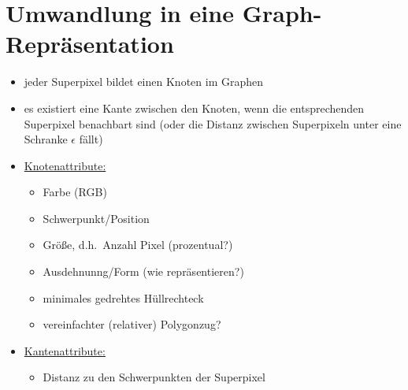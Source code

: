 \section{Umwandlung in eine Graph-Repräsentation}

\begin{itemize}
  \item jeder Superpixel bildet einen Knoten im Graphen
  \item es existiert eine Kante zwischen den Knoten, wenn die entsprechenden Superpixel benachbart sind (oder die Distanz zwischen Superpixeln unter eine Schranke $\epsilon$ fällt)
  \item \underline{Knotenattribute:}
  \begin{itemize}
    \item Farbe (RGB)
    \item Schwerpunkt/Position
    \item Größe, d.h.\ Anzahl Pixel (prozentual?)
    \item Ausdehnunng/Form (wie repräsentieren?)
    \item minimales gedrehtes Hüllrechteck
    \item vereinfachter (relativer) Polygonzug?
  \end{itemize}
  \item \underline{Kantenattribute:}
  \begin{itemize}
    \item Distanz zu den Schwerpunkten der Superpixel
  \end{itemize}
\end{itemize}
